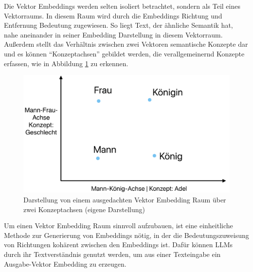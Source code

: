 \documentclass[../main.tex]{subfiles}
\begin{document}
Die Vektor Embeddings werden selten isoliert betrachtet, sondern als Teil eines Vektorraums.
In diesem Raum wird durch die Embeddings Richtung und Entfernung Bedeutung zugewiesen.
So liegt Text, der ähnliche Semantik hat, nahe aneinander in seiner Embedding Darstellung in diesem Vektorraum.
Außerdem stellt das Verhältnis zwischen zwei Vektoren semantische Konzepte dar und es können \enquote{Konzeptachsen} gebildet werden, die verallgemeinernd Konzepte erfassen, wie in Abbildung \ref{fig:embeddingspace} zu erkennen.
\cite{heimerl2018interactive,mikolov2013efficient}

\begin{figure}[ht]
    \centering
    \includegraphics[scale=.23]{"bilder/embeddingspace.png"}
    \caption{Darstellung von einem ausgedachten Vektor Embedding Raum über zwei Konzeptachsen (eigene Darstellung)}
    \label{fig:embeddingspace}
\end{figure}

Um einen Vektor Embedding Raum sinnvoll aufzubauen, ist eine einheitliche Methode zur Generierung von Embeddings nötig, in der die Bedeutungszuweisung von Richtungen kohärent zwischen den Embeddings ist.
Dafür können \glspl{LLM} durch ihr Textverständnis genutzt werden, um aus einer Texteingabe ein Ausgabe-Vektor Embedding zu erzeugen.
\cite{zhang2023language}
\end{document}

